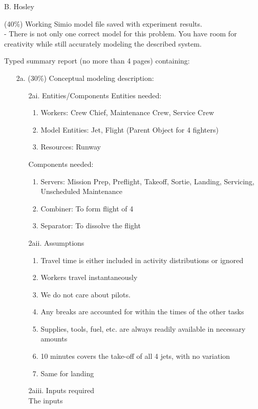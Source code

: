\documentclass[answers]{exam}
\begin{document}
\hspace{\fill} {\large B. Hosley}
\bigskip

\begin{questions}
\unframedsolutions

\question 
(40\%) Working Simio model file saved with experiment results. \\
- There is not only one correct model for this problem. 
You have room for creativity while still accurately modeling the described system.

\question 
Typed summary report (no more than 4 pages) containing:
\begin{enumerate}
	\item[2a.] (30\%) Conceptual modeling description:
	\begin{solution}
		\begin{enumerate}
			\item[2ai.] Entities/Components
				Entities needed:
				\begin{enumerate}
					\item Workers: Crew Chief, Maintenance Crew, Service Crew 
					\item Model Entities: Jet, Flight (Parent Object for 4 fighters)
					\item Resources: Runway
				\end{enumerate}
				Components needed:
				\begin{enumerate}
					\item Servers: Mission Prep, Preflight, Takeoff, Sortie, Landing, Servicing, Unscheduled Maintenance
					\item Combiner: To form flight of 4
					\item Separator: To dissolve the flight
				\end{enumerate}
			\item[2aii.] Assumptions
				\begin{enumerate}
					\item Travel time is either included in activity distributions or ignored
					\item Workers travel instantaneously
					\item We do not care about pilots.
					\item Any breaks are accounted for within the times of the other tasks
					\item Supplies, tools, fuel, etc. are always readily available in necessary amounts
					\item 10 minutes covers the take-off of all 4 jets, with no variation
					\item Same for landing
				\end{enumerate}
			\item[2aiii.] Inputs required \\
				The inputs 
				

\end{enumerate}
\end{solution}
\end{enumerate}
\end{questions}
\end{document}
